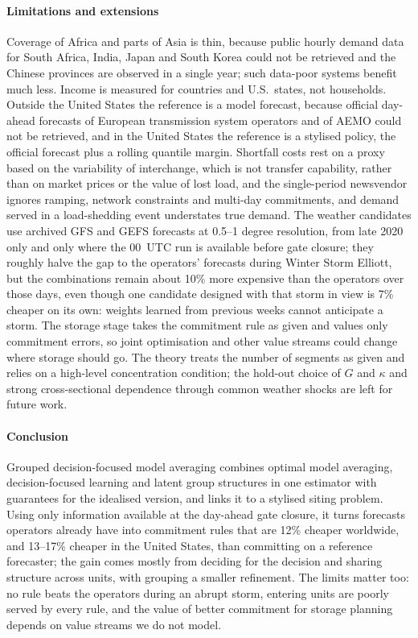 \paragraph{Limitations and extensions}
Coverage of Africa and parts of Asia is thin, because public hourly demand data for South Africa, India, Japan and South Korea could not be retrieved and the Chinese provinces are observed in a single year; such data-poor systems benefit much less. Income is measured for countries and U.S.\ states, not households.
Outside the United States the reference is a model forecast, because official day-ahead forecasts of European transmission system operators and of AEMO could not be retrieved, and in the United States the reference is a stylised policy, the official forecast plus a rolling quantile margin.
Shortfall costs rest on a proxy based on the variability of interchange, which is not transfer capability, rather than on market prices or the value of lost load, and the single-period newsvendor ignores ramping, network constraints and multi-day commitments, and demand served in a load-shedding event understates true demand.
The weather candidates use archived GFS and GEFS forecasts at 0.5--1 degree resolution, from late 2020 only and only where the 00~UTC run is available before gate closure; they roughly halve the gap to the operators' forecasts during Winter Storm Elliott, but the combinations remain about 10\% more expensive than the operators over those days, even though one candidate designed with that storm in view is 7\% cheaper on its own: weights learned from previous weeks cannot anticipate a storm.
The storage stage takes the commitment rule as given and values only commitment errors, so joint optimisation and other value streams could change where storage should go.
The theory treats the number of segments as given and relies on a high-level concentration condition; the hold-out choice of $G$ and $\kappa$ and strong cross-sectional dependence through common weather shocks are left for future work.

\paragraph{Conclusion}
Grouped decision-focused model averaging combines optimal model averaging, decision-focused learning and latent group structures in one estimator with guarantees for the idealised version, and links it to a stylised siting problem.
Using only information available at the day-ahead gate closure, it turns forecasts operators already have into commitment rules that are 12\% cheaper worldwide, and 13--17\% cheaper in the United States, than committing on a reference forecaster; the gain comes mostly from deciding for the decision and sharing structure across units, with grouping a smaller refinement.
The limits matter too: no rule beats the operators during an abrupt storm, entering units are poorly served by every rule, and the value of better commitment for storage planning depends on value streams we do not model.
